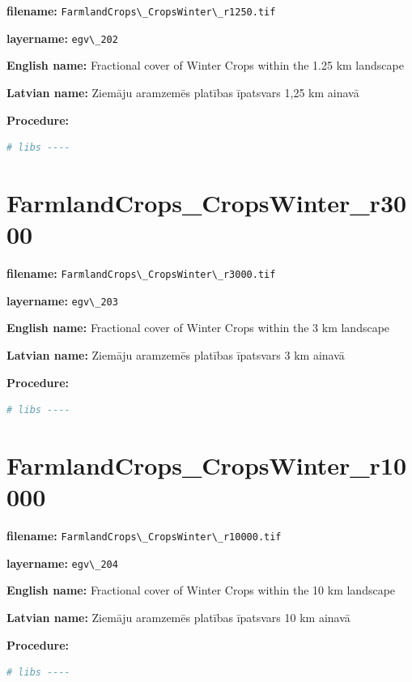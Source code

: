 \documentclass[
]{book}
\newcommand{\passthrough}[1]{#1}
\begin{document}
\textbf{filename:} \passthrough{\lstinline!FarmlandCrops\_CropsWinter\_r1250.tif!}

\textbf{layername:} \passthrough{\lstinline!egv\_202!}

\textbf{English name:} Fractional cover of Winter Crops within the 1.25 km landscape

\textbf{Latvian name:} Ziemāju aramzemēs platības īpatsvars 1,25 km ainavā

\textbf{Procedure:}

\begin{lstlisting}[language=R]
# libs ----
\end{lstlisting}

\section{FarmlandCrops\_CropsWinter\_r3000}\label{ch06.203}

\textbf{filename:} \passthrough{\lstinline!FarmlandCrops\_CropsWinter\_r3000.tif!}

\textbf{layername:} \passthrough{\lstinline!egv\_203!}

\textbf{English name:} Fractional cover of Winter Crops within the 3 km landscape

\textbf{Latvian name:} Ziemāju aramzemēs platības īpatsvars 3 km ainavā

\textbf{Procedure:}

\begin{lstlisting}[language=R]
# libs ----
\end{lstlisting}

\section{FarmlandCrops\_CropsWinter\_r10000}\label{ch06.204}

\textbf{filename:} \passthrough{\lstinline!FarmlandCrops\_CropsWinter\_r10000.tif!}

\textbf{layername:} \passthrough{\lstinline!egv\_204!}

\textbf{English name:} Fractional cover of Winter Crops within the 10 km landscape

\textbf{Latvian name:} Ziemāju aramzemēs platības īpatsvars 10 km ainavā

\textbf{Procedure:}

\begin{lstlisting}[language=R]
# libs ----
\end{lstlisting}
\end{document}
